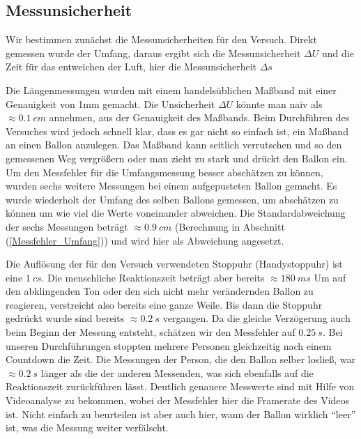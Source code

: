 \documentclass{article}
\begin{document}

        \subsection{Messunsicherheit}
            Wir bestimmen zunächst die Messunsicherheiten für den Versuch.
            Direkt gemessen wurde der Umfang, daraus ergibt sich die Messunsicherheit \(\Delta U\)
            und die Zeit für das entweichen der Luft, hier die Messunsicherheit \(\Delta s\)

            Die Längenmessungen wurden mit einem handelsüblichen Maßband mit einer Genauigkeit von 1mm gemacht.
            Die Unsicherheit \( \Delta U \) könnte man naiv als \( \approx \SI{0.1}{cm} \) annehmen, aus der Genauigkeit des Maßbands.
            Beim Durchführen des Versuches wird jedoch schnell klar, dass es gar nicht so einfach ist, ein Maßband an einen Ballon anzulegen.
            Das Maßband kann seitlich verrutschen und so den gemessenen Weg vergrößern oder man zieht zu stark und drückt den Ballon ein.
            Um den Messfehler für die Umfangsmessung besser abschätzen zu können, wurden
            sechs weitere Messungen bei einem aufgepusteten Ballon gemacht.
            Es wurde wiederholt der Umfang des selben Ballons gemessen, um abschätzen zu können um wie viel die Werte voneinander abweichen.
            Die Standardabweichung der sechs Messungen beträgt \( \approx \SI{0.9}{cm}\) (Berechnung in Abschnitt (\ref{Messfehler_Umfang})) und wird hier als Abweichung angesetzt.
            
            Die Auflösung der für den Versuch verwendeten Stoppuhr (Handystoppuhr) ist eine \(\SI{1}{cs}\).
            Die menschliche Reaktionszeit beträgt aber bereits \(\approx \SI{180}{ms} \) \cite{Reaktionszeit}
            Um auf den abklingenden Ton oder den sich nicht mehr verändernden Ballon zu reagieren, verstreicht also bereits eine ganze Weile.
            Bis dann die Stoppuhr gedrückt wurde sind bereits \(\approx \SI{0.2}{s}\) vergangen.
            Da die gleiche Verzögerung auch beim Beginn der Messung entsteht, schätzen wir den Messfehler auf \(\SI{0.25}{s}\).
            Bei unseren Durchführungen stoppten mehrere Personen gleichzeitig nach einem Countdown die Zeit. Die Messungen der
            Person, die den Ballon selber losließ, war \(\approx \SI{0.2}{s} \) länger als die der anderen Messenden, 
            was sich ebenfalls auf die Reaktionszeit zurückführen lässt.
            Deutlich genauere Messwerte sind mit Hilfe von Videoanalyse zu bekommen, wobei der Messfehler hier die Framerate des Videos ist.
            Nicht einfach zu beurteilen ist aber auch hier, wann der Ballon wirklich \enquote{leer} ist, was die Messung weiter verfälscht.
\end{document}
